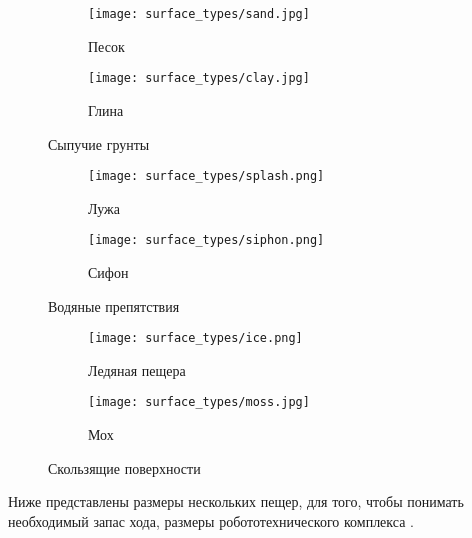 \begin{figure}[H]
\begin{subfigure}{0.49\textwidth}
\texttt{[image: surface\_types/sand.jpg]}\\
\caption{Песок}
\label{fig:sand}
\end{subfigure}
\begin{subfigure}{0.49\textwidth}
\texttt{[image: surface\_types/clay.jpg]}\\
\caption{Глина}
\label{fig:clay}
\end{subfigure}
\caption{Сыпучие грунты}
\label{fig:running_soils}
\end{figure}

\begin{figure}[H]
\begin{subfigure}{0.49\textwidth}
\texttt{[image: surface\_types/splash.png]}\\
\caption{Лужа}
\label{fig:splash}
\end{subfigure}
\begin{subfigure}{0.49\textwidth}
\texttt{[image: surface\_types/siphon.png]}\\
\caption{Сифон}
\label{fig:siphon}
\end{subfigure}
\caption{Водяные препятствия}
\label{fig:water_obstacles}
\end{figure}

\begin{figure}[H]
\begin{subfigure}{0.49\textwidth}
\centering\texttt{[image: surface\_types/ice.png]}\\
\caption{Ледяная пещера}
\label{fig:icee}
\end{subfigure}
\begin{subfigure}{0.49\textwidth}
\centering\texttt{[image: surface\_types/moss.jpg]}\\
\caption{Мох}
\label{fig:moss}
\end{subfigure}
\caption{Скользящие поверхности}
\label{fig:slippery_surfaces}
\end{figure}

Ниже представлены размеры нескольких пещер, для того, чтобы понимать необходимый запас хода, размеры робототехнического комплекса \cite{1960,1963,1969,1971}.

